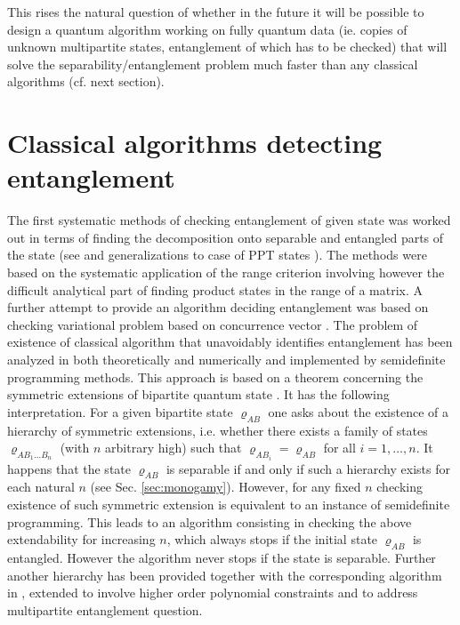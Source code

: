\documentclass[twocolumn,aps,rmp]{revtex4}
\begin{document}
This rises the natural question of whether in the future it will be
possible to design a quantum algorithm working on fully quantum data
(ie. copies of unknown multipartite states, entanglement of which has
to be checked) that will solve the separability/entanglement problem
much faster than any classical algorithms (cf. next section).



\section{Classical algorithms detecting entanglement}
\label{sec:alg_ent}

The first systematic methods of checking entanglement of given state
was worked out in terms of finding the decomposition onto separable
and entangled parts of the state (see \cite{LewensteinSanpera-bsa} and
generalizations to case of PPT states \cite{Karnas,Lewenstein00b}).
The methods were based on the systematic application of the range
criterion involving however the difficult analytical part of finding
product states in the range of a matrix. A further attempt to provide
an algorithm deciding entanglement was based on checking variational
problem based on concurrence vector
\cite{AudenaertVM2000-concurrence}. The problem of existence of
classical algorithm that unavoidably identifies entanglement has been
analyzed in \cite{DohertyAlgorithm1,DohertyAlgorithm2} both
theoretically and numerically and implemented by semidefinite
programming methods.  This approach is based on a theorem concerning
the symmetric extensions of bipartite quantum state
\cite{FannesEtAlSEP,RaggioWernerSEP}. It has the following
interpretation. For a given bipartite state $\varrho_{AB}$ one asks
about the existence of a hierarchy of symmetric extensions, i.e.
whether there exists a family of states $\varrho_{AB_{1}...B_{n}}$
(with $n$ arbitrary high) such that $\varrho_{AB_{i}}=\varrho_{AB}$
for all $i=1,\ldots,n$. It happens that the state $\varrho_{AB}$ is
separable if and only if such a hierarchy exists for each natural $n$
(see Sec. \ref{sec:monogamy}). However, for any fixed $n$ checking
existence of such symmetric extension is equivalent to an instance of
semidefinite programming. This leads to an algorithm consisting in
checking the above extendability for increasing $n$, which always
stops if the initial state $\varrho_{AB}$ is entangled. However the
algorithm never stops if the state is separable. Further another
hierarchy has been provided together with the corresponding algorithm
in \cite{EisertAlgorithm}, extended to involve higher order polynomial
constraints and to address multipartite entanglement question.
\end{document}
